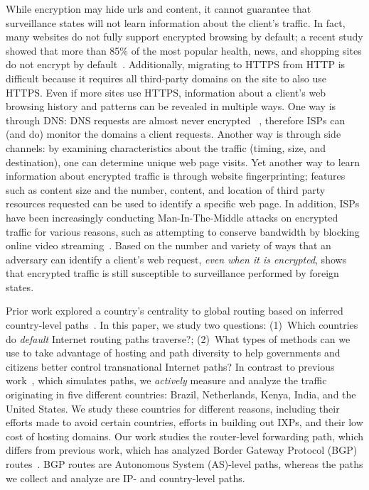 While encryption may hide urls and content, it cannot guarantee that surveillance 
states will not learn information about the client's traffic.  In fact, many websites do not fully support 
encrypted browsing by default; a recent study showed that more than 85\% of the most popular 
health, news, and shopping sites do not encrypt by default~\cite{what_isps_can_see}.  Additionally, migrating 
to HTTPS from HTTP is difficult because it requires all third-party domains on the site to also use 
HTTPS.  Even if more sites use HTTPS, information about a client's web browsing history and patterns 
can be revealed in multiple ways. One way is through DNS: DNS requests are almost never encrypted ~\cite{what_isps_can_see}, therefore 
ISPs can (and do) monitor the domains a client requests.  Another way is through side channels: by examining 
characteristics about the traffic (timing, size, and destination), one can determine unique web page visits.  
Yet another way to learn information about encrypted traffic is through website fingerprinting; features 
such as content size and the number, content, and location of third party resources requested can be used to 
identify a specific web page.  In addition, ISPs have been increasingly conducting Man-In-The-Middle attacks on 
encrypted traffic for various reasons, such as attempting to conserve bandwidth by blocking online video streaming~\cite{mitm_isp}.  
Based on the number and variety of ways that an adversary can identify a client's web request, \textit{even when it is encrypted}, 
shows that encrypted traffic is still susceptible to surveillance performed by foreign states.

Prior work explored a country's centrality to global routing based on 
inferred country-level paths~\cite{karlin2009nation}. 
In this paper, we study two questions: (1)~Which countries do {\em
  default} Internet routing paths traverse?; (2)~What types of methods
can we use to take advantage of hosting and path diversity to help governments
and citizens better control transnational Internet paths? 
In contrast to previous work~\cite{karlin2009nation}, which simulates paths, we \textit{actively} measure and analyze the traffic originating in
five different countries: Brazil, Netherlands, Kenya, India, and the
United States.  We study these countries for different reasons, including their efforts made to avoid certain countries, efforts in building out IXPs, and their low cost of hosting domains.  Our work studies the router-level forwarding path, which differs from 
 previous work, which has analyzed Border Gateway Protocol (BGP) routes~\cite{karlin2009nation,shah2015characterizing}.  
BGP routes are Autonomous System (AS)-level paths, whereas the paths we collect and analyze are IP- and country-level paths.

